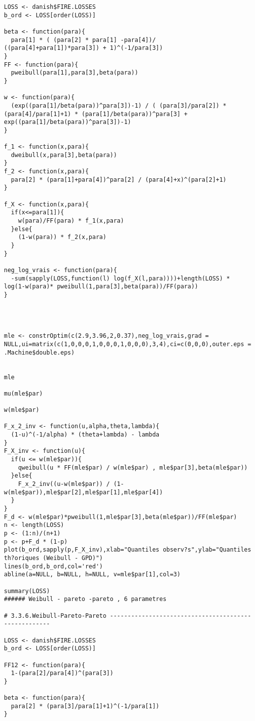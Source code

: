 \begin{verbatim}
LOSS <- danish$FIRE.LOSSES
b_ord <- LOSS[order(LOSS)]

beta <- function(para){
  para[1] * ( (para[2] * para[1] -para[4])/ ((para[4]+para[1])*para[3]) + 1)^(-1/para[3])
}
FF <- function(para){
  pweibull(para[1],para[3],beta(para))
}

w <- function(para){
  (exp((para[1]/beta(para))^para[3])-1) / ( (para[3]/para[2]) * (para[4]/para[1]+1) * (para[1]/beta(para))^para[3] +  exp((para[1]/beta(para))^para[3])-1) 
}

f_1 <- function(x,para){
  dweibull(x,para[3],beta(para))
}
f_2 <- function(x,para){
  para[2] * (para[1]+para[4])^para[2] / (para[4]+x)^(para[2]+1)
}

f_X <- function(x,para){
  if(x<=para[1]){
    w(para)/FF(para) * f_1(x,para)
  }else{
    (1-w(para)) * f_2(x,para)
  } 
}

neg_log_vrais <- function(para){
  -sum(sapply(LOSS,function(l) log(f_X(l,para))))+length(LOSS) * log(1-w(para)* pweibull(1,para[3],beta(para))/FF(para))
}




mle <- constrOptim(c(2.9,3.96,2,0.37),neg_log_vrais,grad = NULL,ui=matrix(c(1,0,0,0,1,0,0,0,1,0,0,0),3,4),ci=c(0,0,0),outer.eps = .Machine$double.eps)


mle

mu(mle$par)

w(mle$par)

F_x_2_inv <- function(u,alpha,theta,lambda){
  (1-u)^(-1/alpha) * (theta+lambda) - lambda
}
F_X_inv <- function(u){
  if(u <= w(mle$par)){
    qweibull(u * FF(mle$par) / w(mle$par) , mle$par[3],beta(mle$par))
  }else{
    F_x_2_inv((u-w(mle$par)) / (1-w(mle$par)),mle$par[2],mle$par[1],mle$par[4])
  }
}
F_d <- w(mle$par)*pweibull(1,mle$par[3],beta(mle$par))/FF(mle$par)
n <- length(LOSS)
p <- (1:n)/(n+1)
p <- p+F_d * (1-p)
plot(b_ord,sapply(p,F_X_inv),xlab="Quantiles observ?s",ylab="Quantiles th?oriques (Weibull - GPD)")
lines(b_ord,b_ord,col='red')
abline(a=NULL, b=NULL, h=NULL, v=mle$par[1],col=3)

summary(LOSS)
###### Weibull - pareto -pareto , 6 parametres

# 3.3.6.Weibull-Pareto-Pareto -----------------------------------------------------

LOSS <- danish$FIRE.LOSSES
b_ord <- LOSS[order(LOSS)]

FF12 <- function(para){
  1-(para[2]/para[4])^(para[3])
}

beta <- function(para){
  para[2] * (para[3]/para[1]+1)^(-1/para[1])
}


\end{verbatim}
